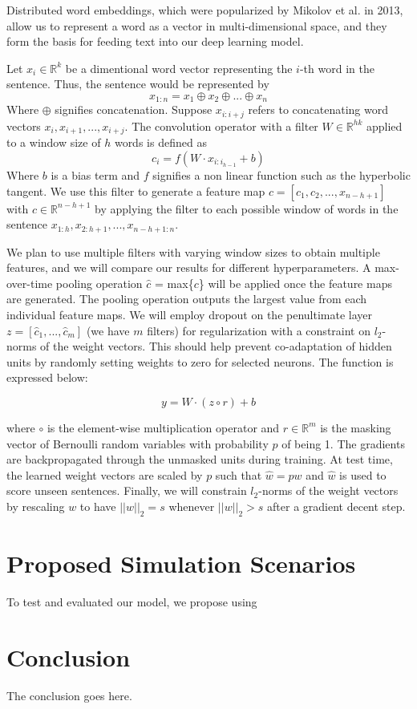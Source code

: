 \documentclass[conference]{IEEEtran}
\begin{document}
     Distributed word embeddings, which were popularized by Mikolov et al.
     in 2013\cite{word2vec}, allow us to represent a word as a vector in
     multi-dimensional space, and they form the basis for feeding text into our deep
     learning model.

     Let $x_{i} \in \mathbb{R}^k$ be a dimentional word vector representing the $i$-th word in the 
     sentence. Thus, the sentence would be represented by 
     \begin{equation}
      x_{1:n} = x_1 \oplus x_2 \oplus ... \oplus x_n
      \end{equation}
      Where $\oplus$ signifies concatenation. Suppose $x_{i:i+j}$ refers to concatenating 
      word vectors $x_i, x_{i+1}, ... , x_{i+j}$. The convolution operator with a filter
       $W \in \mathbb{R}^{hk}$ applied to a window size of $h$ 
      words is defined as 
      \begin{equation}
      c_i = f(W \cdot x_{i:i_{h-1}} + b)
      \end{equation}
      Where $b$ is a bias term and $f$ signifies a non linear function such as the hyperbolic
      tangent. We use this filter to generate a feature map $c = [c_1, c_2, ... ,x_{n-h+1}]$ 
      with $c \in \mathbb{R}^{n-h+1}$ by applying the filter to each possible window of words in
      the sentence $x_{1:h}, x_{2:h+1}, ... ,x_{n-h+1:n}$. 
 
      We plan to use multiple filters with varying window sizes to obtain multiple features, and we will      
      compare our results for different hyperparameters. 
      A max-over-time pooling operation $\hat{c}$ = max\{$c$\} will be applied once the feature 
      maps are generated. The pooling operation outputs the largest value from each individual
      feature maps. We will employ dropout on the penultimate layer $z = [\hat{c}_1,...,\hat{c}_m]$ 
      (we have $m$ filters) for regularization with a constraint on $l_2$-norms of the weight
      vectors. This should help prevent co-adaptation of hidden units by randomly setting weights 
      to zero for selected neurons. The function is expressed below: 
 
      \begin{equation}
       y = W \cdot (z \circ r) + b
      \end{equation}
      
      where $\circ$ is the element-wise multiplication operator and $r \in \mathbb{R}^m$ is 
      the masking vector of Bernoulli random variables with probability $p$ of being 1. 
      The gradients are backpropagated through the unmasked units during training. At test 
      time, the learned weight vectors are scaled by $p$ such that $\hat{w} = pw$ and $\hat{w}$ 
      is used to score unseen sentences. Finally, we will constrain $l_2$-norms of the weight 
      vectors by rescaling $w$ to have $||w||_2 = s$ whenever $||w||_2 > s$ after a gradient
      decent step.
      
\section{Proposed Simulation Scenarios}
      To test and evaluated our model, we propose using
\section{Conclusion}
The conclusion goes here.



\end{document}
